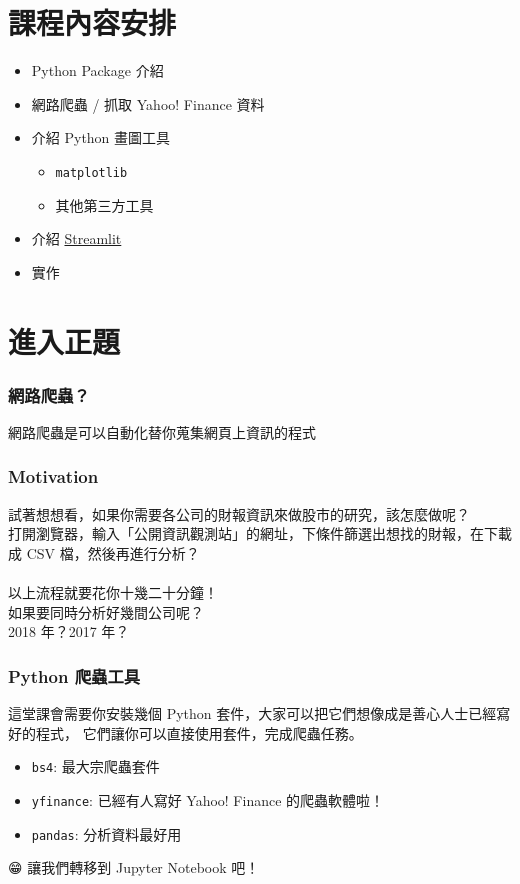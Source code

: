 \documentclass{beamer}
\newcommand{\code}[1]{\texttt{\textcolor{pinky}{#1}}}
\begin{document}
\section{課程內容安排}
\begin{frame}
\begin{itemize}
  \item Python Package 介紹
  \item 網路爬蟲 / 抓取 Yahoo! Finance 資料
  \item 介紹 Python 畫圖工具           
  \begin{itemize}
    \item \code{matplotlib}
    \item 其他第三方工具
  \end{itemize}
  \item 介紹 \href{https://streamlit.io}{Streamlit}                     
  \item 實作                               
\end{itemize}
\end{frame}

\section{進入正題}
\begin{frame}
    \frametitle{網路爬蟲？}
網路爬蟲是可以自動化替你蒐集網頁上資訊的程式

\end{frame}

\begin{frame}
    \frametitle{Motivation}

    試著想想看，如果你需要各公司的財報資訊來做股市的研究，該怎麼做呢？\\
    打開瀏覽器，輸入「公開資訊觀測站」的網址，下條件篩選出想找的財報，在下載成 CSV 檔，然後再進行分析？\footnotemark\\
    \quad \\ 
    以上流程就要花你十幾二十分鐘！\\
    如果要同時分析好幾間公司呢？\\
    2018 年？2017 年？
\end{frame}

\begin{frame}
    \frametitle{Python 爬蟲工具}
    這堂課會需要你安裝幾個 Python 套件，大家可以把它們想像成是善心人士已經寫好的程式，
    它們讓你可以直接使用套件，完成爬蟲任務。

    \begin{itemize}
        \item \code{bs4}: 最大宗爬蟲套件
        \item \code{yfinance}: 已經有人寫好 Yahoo! Finance 的爬蟲軟體啦！
        \item \code{pandas}: 分析資料最好用
    \end{itemize}

\end{frame}

\begin{frame}
    
    {\DejaSans 😁} 讓我們轉移到 Jupyter Notebook 吧！

\end{frame}
\end{document}
